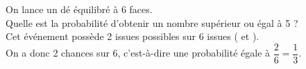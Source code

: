 \vspace{0.3cm}

\begin{Exemple}  On lance un dé équilibré à 6 faces. \\
Quelle est la probabilité d'obtenir un nombre supérieur ou égal à 5 ? \\
Cet événement possède 2 issues possibles sur 6 issues ( \fg{} et  \fg{}). \\
On a donc 2 chances sur 6, c'est-à-dire une probabilité égale à $\dfrac{2}{6}=\dfrac{1}{3}$.
\end{Exemple}

